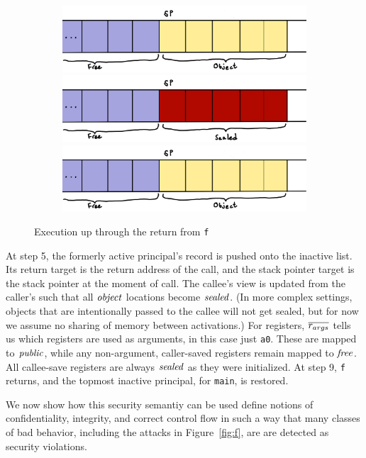 \documentclass[10pt,conference]{ieeetran}%
\theoremstyle{definition}
\begin{document}
\begin{figure}
\begin{subfigure}[t]{.4\textwidth}
    \includegraphics[width=\columnwidth]{stack2.png}
    \includegraphics[width=\columnwidth]{stack3.png}
    \includegraphics[width=\columnwidth]{stack4.png}
  \end{subfigure}

\caption{Execution up through the return from {\tt f}}
\label{fig:exec1}
\end{figure}
%
At step 5, the formerly active principal's record is pushed onto the inactive list.
Its return target is the return address of the call, 
and the stack pointer target is the stack pointer at the moment of call.
The callee's view is updated from the caller's such that all \(\mathit{object}\) locations
become \(\mathit{sealed}\). (In more complex settings, objects that are intentionally passed
to the callee will not get sealed, but for now we assume no sharing of memory between activations.)
For registers, \(\overline{r_{args}}\) tells us which registers are used as arguments,
in this case just {\tt a0}. These are mapped to \(\mathit{public}\), while any non-argument, caller-saved
registers remain  mapped to \(\mathit{free}\). All callee-save registers are always \(\mathit{sealed}\)
as they were initialized.
At step 9, {\tt f} returns, and the topmost inactive principal, for {\tt main}, is restored.

We now show how this security semantiy can be used define notions of confidentiality,
integrity, and correct control flow in such a way that many classes of
bad behavior, including the attacks in Figure~\ref{fig:f}, are 
are detected as security violations. 
\end{document}

